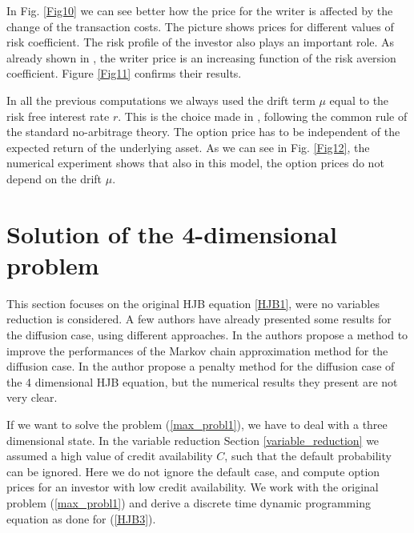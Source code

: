 In Fig. \ref{Fig10} we can see better how the price for the writer is affected by the change of the transaction costs. 
The picture shows prices for different values of risk coefficient.
The risk profile of the investor also plays an important role. As already shown in \cite{HoNe89}, the writer price is an
increasing function of the risk aversion coefficient. Figure \ref{Fig11} confirms their results.

In all the previous computations we always used the drift term $\mu$ equal to the risk free interest rate $r$. This is the choice   
made in \cite{HoNe89}, following the common rule of the standard no-arbitrage
theory.
The option price has to be independent of the expected return of the underlying asset.
As we can see in Fig. \ref{Fig12}, the numerical experiment shows that also in this model, the option prices 
do not depend on the drift $\mu$.



\section{Solution of the 4-dimensional problem}\label{full_eq_section}

This section focuses on the original HJB equation \ref{HJB1}, were no variables reduction is considered. 
A few authors have already presented some results for the diffusion case, using different approaches.
In \cite{Pal15} the authors propose a method to improve the performances of the Markov chain approximation method for the diffusion case. In \cite{Song14} the author propose
a penalty method for the diffusion case of the 4 dimensional HJB equation, but the numerical results they present are not very clear.

If we want to solve the problem (\ref{max_probl1}), we have to deal with a three dimensional state. In the variable reduction Section \ref{variable_reduction}
we assumed a high value of credit availability $C$, such that the default probability can be ignored. 
Here we do not ignore the default case, and compute option prices for an investor with low credit availability.
We work with the original problem (\ref{max_probl1}) and derive a discrete time dynamic programming equation as done for (\ref{HJB3}).

